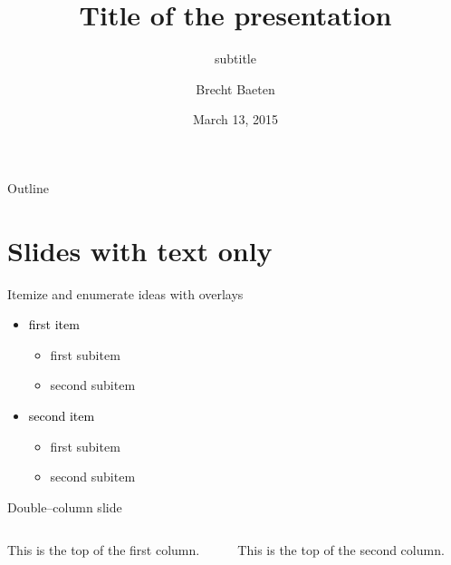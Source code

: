 \documentclass[11pt,t]{beamer}
\title{Title of the presentation}
\subtitle{subtitle}
\author{Brecht Baeten}
\institute{TME, Mechanical engineering, KU Leuven}
\date{March 13, 2015}
\begin{document}
	{
	\begin{frame}
		\titlepage
	\end{frame}
	}
\begin{frame}{Outline}
	\vskip 5mm
	\hfill	{\large \parbox{.95\textwidth}{\tableofcontents[hideallsubsections]}}
\end{frame}

\section{Slides with text only}
\begin{frame}{Itemize and enumerate ideas with overlays}
	\begin{itemize}
		\item \textcolor{black}{first item}
			\begin{itemize}
				\item first subitem
				\item second subitem
			\end{itemize}
		\item \textcolor{black}{second item}
			\begin{itemize}
				\item first subitem
				\item second subitem
			\end{itemize}
	\end{itemize}
\end{frame}
\begin{frame}[t]{Double--column slide}
	\begin{columns}[t]
		\begin{column}{.5\textwidth}
			This is the top of the first column.	
		\end{column}
		\begin{column}{.5\textwidth}
			This is the top of the second column.
		\end{column}
	\end{columns}	
\end{frame}
\end{document}
